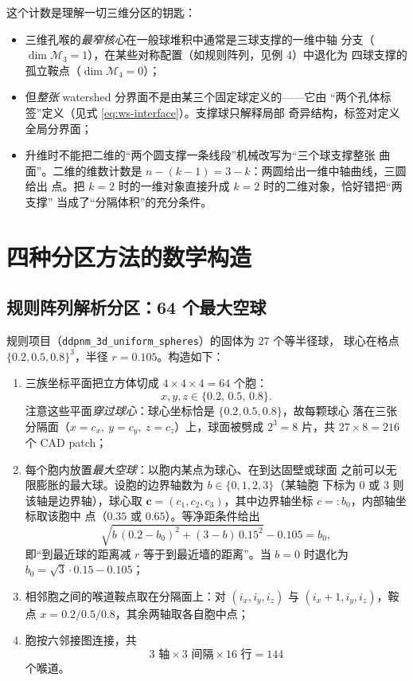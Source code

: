 \documentclass[UTF8,zihao=-4]{ctexart}
\newcommand{\cc}{\bm c}
\begin{document}
这个计数是理解一切三维分区的钥匙：
\begin{itemize}
  \item 三维孔喉的\emph{最窄核心}在一般球堆积中通常是三球支撑的一维中轴
  分支（$\dim\mathcal M_3=1$），在某些对称配置（如规则阵列，见例 4）中退化为
  四球支撑的孤立鞍点（$\dim\mathcal M_4=0$）；
  \item 但\emph{整张} watershed 分界面不是由某三个固定球定义的——它由
  ``两个孔体标签''定义（见式 \eqref{eq:ws-interface}）。支撑球只解释局部
  奇异结构，标签对定义全局分界面；
  \item 升维时不能把二维的``两个圆支撑一条线段''机械改写为``三个球支撑整张
  曲面''。二维的维数计数是 $n-(k-1)=3-k$：两圆给出一维中轴曲线，三圆给出
  点。把 $k=2$ 时的一维对象直接升成 $k=2$ 时的二维对象，恰好错把``两支撑''
  当成了``分隔体积''的充分条件。
\end{itemize}

\section{四种分区方法的数学构造}

\subsection{规则阵列解析分区：64 个最大空球}

规则项目（\texttt{ddpnm\_3d\_uniform\_spheres}）的固体为 $27$ 个等半径球，
球心在格点 $\{0.2,0.5,0.8\}^3$，半径 $r=0.105$。构造如下：

\begin{enumerate}
  \item 三族坐标平面把立方体切成 $4\times4\times4=64$ 个胞：
  \begin{equation}\label{eq:reg-planes}
    x,y,z\in\{0.2,\,0.5,\,0.8\}.
  \end{equation}
  注意这些平面\emph{穿过球心}：球心坐标恰是 $\{0.2,0.5,0.8\}$，故每颗球心
  落在三张分隔面（$x=c_x,\ y=c_y,\ z=c_z$）上，球面被劈成 $2^3=8$ 片，共
  $27\times8=216$ 个 CAD patch；
  \item 每个胞内放置\emph{最大空球}：以胞内某点为球心、在到达固壁或球面
  之前可以无限膨胀的最大球。设胞的边界轴数为 $b\in\{0,1,2,3\}$（某轴胞
  下标为 $0$ 或 $3$ 则该轴是边界轴），球心取
  $\cc=(c_1,c_2,c_3)$，其中边界轴坐标 $c=:b_0$，内部轴坐标取该胞中
  点（$0.35$ 或 $0.65$）。等净距条件给出
  \begin{equation}\label{eq:reg-ball}
    \sqrt{b\,(0.2-b_0)^2+(3-b)\,0.15^2}-0.105=b_0,
  \end{equation}
  即``到最近球的距离减 $r$ 等于到最近墙的距离''。当 $b=0$ 时退化为
  $b_0=\sqrt{3}\cdot 0.15-0.105$；
  \item 相邻胞之间的喉道鞍点取在分隔面上：对 $(i_x,i_y,i_z)$ 与
  $(i_x+1,i_y,i_z)$，鞍点 $x=0.2/0.5/0.8$，其余两轴取各自胞中点；
  \item 胞按六邻接图连接，共
  \begin{equation}
    3\text{ 轴}\times3\text{ 间隔}\times16\text{ 行}=144
  \end{equation}
  个喉道。
\end{enumerate}
\end{document}
